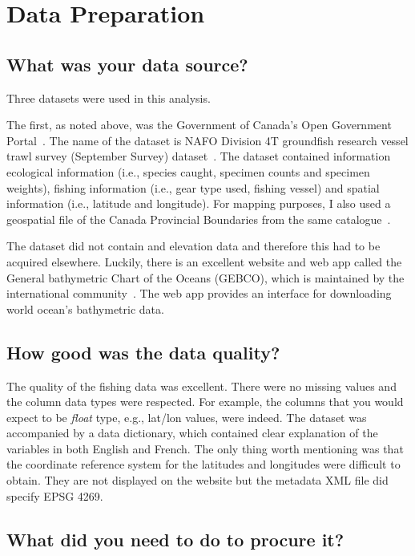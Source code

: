 \section{Data Preparation}

\subsection{What was your data source?}

Three datasets were used in this analysis.

The first, as noted above, was the Government of Canada's Open Government Portal~\cite{ogp}.
The name of the dataset is NAFO Division 4T groundfish research vessel trawl survey (September Survey) dataset~\cite{groundfish}.
The dataset contained information ecological information (i.e., species caught, specimen counts and specimen weights),
fishing information (i.e., gear type used, fishing vessel) and spatial information (i.e., latitude and longitude).
For mapping purposes, I also used a geospatial file of the Canada Provincial Boundaries from the same catalogue~\cite{canmap}.

The dataset did not contain and elevation data and therefore this had to be acquired elsewhere.
Luckily, there is an excellent website and web app called the General bathymetric Chart of the Oceans (GEBCO),
which is maintained by the international community~\cite{gebco}.
The web app provides an interface for downloading world ocean's bathymetric data.

\subsection{How good was the data quality?}

The quality of the fishing data was excellent.
There were no missing values and the column data types were respected.
For example, the columns that you would expect to be \textit{float} type, e.g., lat/lon values, were indeed.
The dataset was accompanied by a data dictionary, which contained clear explanation of the variables in both English and French.
The only thing worth mentioning was that the coordinate reference system for the latitudes and longitudes were difficult to obtain.
They are not displayed on the website but the metadata XML file did specify EPSG 4269.

\subsection{What did you need to do to procure it?}


